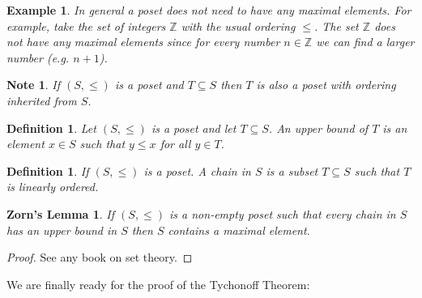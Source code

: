 \documentclass[11pt, letterpaper, oneside]{report}
\theoremstyle{pplain}
\newtheorem{ITERMVALUE THM}[theorem]{Intermediate Value Theorem}
\newtheorem{HEINEBOREL THM}[theorem]{Heine-Borel Theorem}
\newtheorem{UMETR THM}[theorem]{Urysohn Metrization Theorem}
\newtheorem{UMETR2 THM}[theorem]{Urysohn Metrization Theorem (v.2)}
\newtheorem{ZORNLEMMA}[theorem]{Zorn's Lemma}
\theoremstyle{ddefinition}
\newtheorem{definition}[theorem]{Definition}
\newtheorem{example}[theorem]{Example}
\newtheorem{note}[theorem]{Note}
\theoremstyle{nnn}
\newtheorem{TDA NN}[theorem]{Topological Data Analysis. }
\theoremstyle{eexercise}
\newcommand{\Z}{{\mathbb Z}}
\begin{document}
\begin{example}
In general a poset does not need to have any maximal elements. For example,  take the set  
of integers $\Z$ with the usual ordering $\leq$. The set $\Z$ does not have any maximal elements 
since for every number $n\in \Z$ we can find a larger number (e.g. $n+1$).   
\end{example}

\begin{note}
If $(S, \leq)$ is a poset and $T\subseteq S$ then $T$ is also a poset with ordering inherited from 
$S$. 
\end{note}


\begin{definition}
Let $(S, \leq)$ is a poset and let  $T\subseteq S$. An \emph{upper bound of $T$} is an element 
$x\in S$ such that  $y\leq x$ for all $y\in T$.  
\end{definition}


\begin{definition}
If $(S, \leq)$ is a poset. A \emph{chain} in $S$ is a subset  $T\subseteq S$ such that 
$T$ is linearly ordered.   
\end{definition}


\begin{ZORNLEMMA}
\label{LEMMA_ZL}
If $(S, \leq)$ is a non-empty poset such that every chain in $S$ has an upper bound in $S$
then $S$ contains a maximal element.  
\end{ZORNLEMMA}

\begin{proof}
See any book on set theory. 
\end{proof}


We are finally ready for the proof of the Tychonoff Theorem: 
\end{document}

